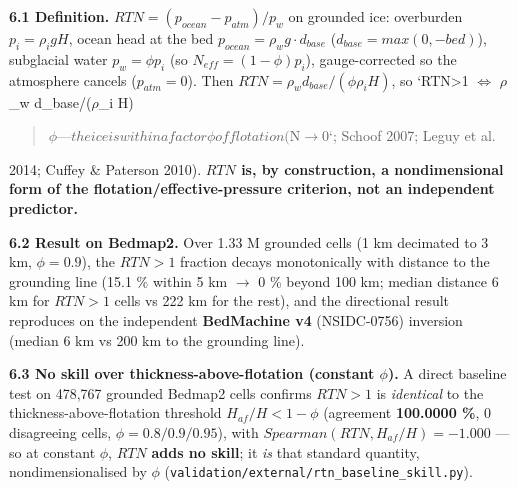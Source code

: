 \documentclass[tc, manuscript]{copernicus}
\begin{document}
\textbf{6.1 Definition.} $RTN = (p_{ocean} - p_{atm})/p_{w}$ on grounded ice: overburden $p_{i}=\rho _{i} g H$, ocean head at the bed $p_{ocean}=\rho _{w} g\cdot d_{base}$ ($d_{base}=max(0,-bed)$), subglacial water $p_{w}=\phi  p_{i}$ (so $N_{eff}=(1-\phi )p_{i}$), gauge-corrected so the atmosphere cancels ($p_{atm}=0$). Then $RTN = \rho _{w} d_{base}/(\phi  \rho _{i} H)$, so `RTN>1 \ensuremath{\iff} \ensuremath{\rho}\_w d\_base/(\ensuremath{\rho}\_i H)

\begin{quote}
\ensuremath{\phi}$ \mbox{---} the ice is within a factor $\ensuremath{\phi}$ of flotation ($N\ensuremath{\to}0`; Schoof 2007; Leguy et al.
\end{quote}

2014; Cuffey \& Paterson 2010). \textbf{$RTN$ is, by construction, a nondimensional form of the flotation/effective-pressure criterion, not an independent predictor.}

\textbf{6.2 Result on Bedmap2.} Over 1.33 M grounded cells (1 km decimated to 3 km, $\phi =0.9$), the $RTN>1$ fraction decays monotonically with distance to the grounding line (15.1 \% within 5 km \ensuremath{\to} 0 \% beyond 100 km; median distance 6 km for $RTN>1$ cells vs 222 km for the rest), and the directional result reproduces on the independent \textbf{BedMachine v4} (NSIDC-0756) inversion (median 6 km vs 200 km to the grounding line).

\textbf{6.3 No skill over thickness-above-flotation (constant $\phi $).} A direct baseline test on 478,767 grounded Bedmap2 cells confirms ${RTN>1}$ is \emph{identical} to the thickness-above-flotation threshold ${H_{af}/H<1-\phi }$ (agreement \textbf{100.0000 \%}, 0 disagreeing cells, $\phi =0.8/0.9/0.95$), with $Spearman(RTN, H_{af}/H)=-1.000$ — so at constant $\phi $, $RTN$ \textbf{adds no skill}; it \emph{is} that standard quantity, nondimensionalised by $\phi $ (\texttt{validation/\allowbreak{}external/\allowbreak{}rtn\_\allowbreak{}baseline\_\allowbreak{}skill.\allowbreak{}py}).
\end{document}
